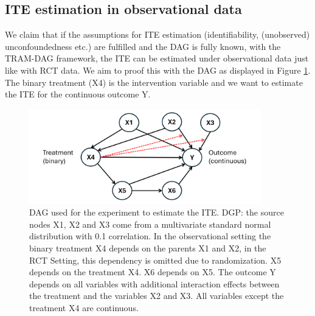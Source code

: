 
\subsection{ITE estimation in observational data}

We claim that if the assumptions for ITE estimation (identifiability, (unobserved) unconfoundedness etc.) are fulfilled and the DAG is fully known, with the TRAM-DAG framework, the ITE can be estimated under observational data just like with RCT data. We aim to proof this with the DAG as displayed in Figure \ref{fig:ite_dag_observational}. The binary treatment (X4) is the intervention variable and we want to estimate the ITE for the continuous outcome Y. 


\begin{figure}[H]
\centering
\includegraphics[width=0.9\textwidth]{img/dag_ITE_observational.png}
\caption{DAG used for the experiment to estimate the ITE. DGP: the source nodes X1, X2 and X3 come from a multivariate standard normal distribution with 0.1 correlation. In the observational setting the binary treatment X4 depends on the parents X1 and X2, in the RCT Setting, this dependency is omitted due to randomization. X5 depends on the treatment X4. X6 depends on X5. The outcome Y depends on all variables with additional interaction effects between the treatment and the variables X2 and X3. All variables except the treatment X4 are continuous.}
\label{fig:ite_dag_observational}
\end{figure}

% 



